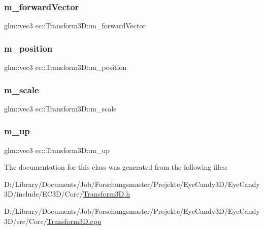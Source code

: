 \subsubsection{\texorpdfstring{m\+\_\+forward\+Vector}{m\_forwardVector}}
{\footnotesize\ttfamily glm\+::vec3 ec\+::\+Transform3\+D\+::m\+\_\+forward\+Vector\hspace{0.3cm}{\ttfamily [protected]}}

\mbox{\label{classec_1_1_transform3_d_a5bba8c29bb22d2b122b64b51b52335f7}} 
\subsubsection{\texorpdfstring{m\+\_\+position}{m\_position}}
{\footnotesize\ttfamily glm\+::vec3 ec\+::\+Transform3\+D\+::m\+\_\+position\hspace{0.3cm}{\ttfamily [protected]}}

\mbox{\label{classec_1_1_transform3_d_a8eb8cecaa5ec8273e49c9487e0f6b935}} 
\subsubsection{\texorpdfstring{m\+\_\+scale}{m\_scale}}
{\footnotesize\ttfamily glm\+::vec3 ec\+::\+Transform3\+D\+::m\+\_\+scale\hspace{0.3cm}{\ttfamily [protected]}}

\mbox{\label{classec_1_1_transform3_d_addd1132fb57befe841dfd9af94aa4329}} 
\subsubsection{\texorpdfstring{m\+\_\+up}{m\_up}}
{\footnotesize\ttfamily glm\+::vec3 ec\+::\+Transform3\+D\+::m\+\_\+up\hspace{0.3cm}{\ttfamily [protected]}}



The documentation for this class was generated from the following files\+:\begin{DoxyCompactItemize}
\item 
D\+:/\+Library/\+Documents/\+Job/\+Forschungsmaster/\+Projekte/\+Eye\+Candy3\+D/\+Eye\+Candy3\+D/include/\+E\+C3\+D/\+Core/\mbox{\hyperlink{_transform3_d_8h}{Transform3\+D.\+h}}\item 
D\+:/\+Library/\+Documents/\+Job/\+Forschungsmaster/\+Projekte/\+Eye\+Candy3\+D/\+Eye\+Candy3\+D/src/\+Core/\mbox{\hyperlink{_transform3_d_8cpp}{Transform3\+D.\+cpp}}\end{DoxyCompactItemize}
